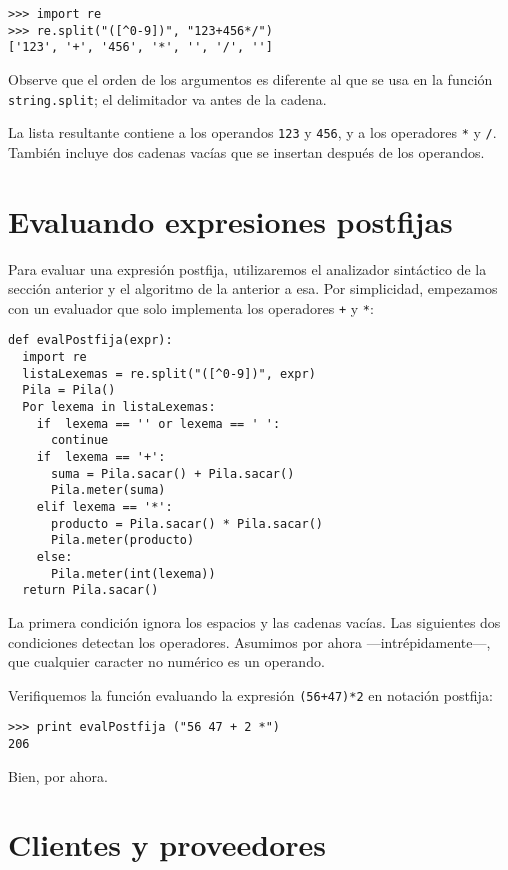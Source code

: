 \beforeverb
\begin{verbatim}
>>> import re
>>> re.split("([^0-9])", "123+456*/")
['123', '+', '456', '*', '', '/', '']
\end{verbatim}
\afterverb
%
Observe que el orden de los argumentos es diferente al que se usa en la
función \texttt{string.split}; el delimitador va antes de la cadena.

La lista resultante contiene a los operandos \texttt{123} y \texttt{456}, y 
a los operadores \texttt{*} y \texttt{/}.  También incluye dos cadenas
vacías que se insertan después de los operandos.


\section {Evaluando expresiones postfijas}

Para evaluar una expresión postfija, utilizaremos el analizador sintáctico
de la sección anterior y el algoritmo de la anterior a esa. 
Por simplicidad, empezamos con un evaluador que solo 
implementa los operadores \texttt{+} y \texttt{*}:


\begin{verbatim}
def evalPostfija(expr):
  import re
  listaLexemas = re.split("([^0-9])", expr)
  Pila = Pila()
  Por lexema in listaLexemas:
    if  lexema == '' or lexema == ' ':
      continue
    if  lexema == '+':
      suma = Pila.sacar() + Pila.sacar()
      Pila.meter(suma)
    elif lexema == '*':
      producto = Pila.sacar() * Pila.sacar()
      Pila.meter(producto)
    else:
      Pila.meter(int(lexema))
  return Pila.sacar()
\end{verbatim}
%
La primera condición ignora los espacios y las cadenas vacías.  Las 
siguientes dos condiciones detectan los operadores. Asumimos por ahora 
---intrépidamente---, que cualquier caracter no numérico es un operando. 

Verifiquemos la función evaluando la expresión \texttt{(56+47)*2} en notación
 postfija:

\beforeverb
\begin{verbatim}
>>> print evalPostfija ("56 47 + 2 *")
206
\end{verbatim}
\afterverb
%
Bien, por ahora.


\section {Clientes y proveedores}

